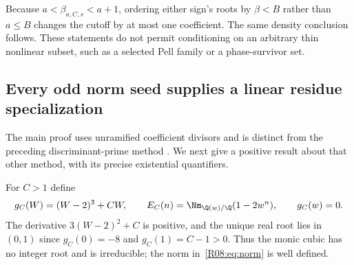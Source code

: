 \documentclass[11pt,a4paper]{article}
\theoremstyle{definition}\newtheorem{definition}[theorem]{Definition}
\theoremstyle{remark}\newtheorem{remark}[theorem]{Remark}
\begin{document}
Because $a<\beta_{a,C,s}<a+1$, ordering either sign's roots by
$\beta<B$ rather than $a\le B$ changes the cutoff by at most one
coefficient. The same density conclusion follows.
These statements do not permit conditioning on an arbitrary thin nonlinear
subset, such as a selected Pell family or a phase-survivor set.

\subsection{Every odd norm seed supplies a linear residue specialization}
\label{R08:sec:norm}

The main proof uses unramified coefficient divisors and is distinct from
the preceding discriminant-prime method \cite{R06}.
We next give a positive result about that other method, with its precise
existential quantifiers.

For $C>1$ define
\begin{equation}\label{R08:eq:norm}
 g_C(W)=(W-2)^3+CW,\qquad
 E_C(n)=\Nm_{\Q(w)/\Q}(1-2w^n),\qquad g_C(w)=0.
\end{equation}
The derivative $3(W-2)^2+C$ is positive, and the unique real root
lies in $(0,1)$ since $g_C(0)=-8$ and $g_C(1)=C-1>0$.
Thus the monic cubic has no integer root and is irreducible;
the norm in~\eqref{R08:eq:norm} is well defined.
\end{document}
